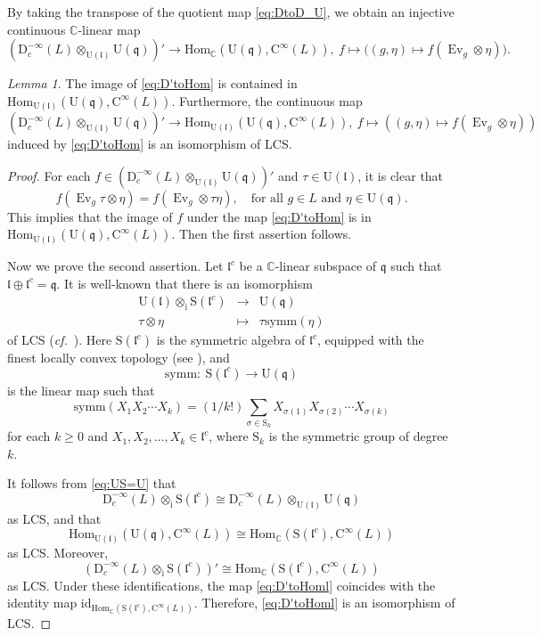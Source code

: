 \documentclass[12pt, a4paper]{amsart}
\newcommand{\BC}{{\mathbb {C}}}
\newcommand{\RC}{{\mathrm {C}}}
\newcommand{\RD}{{\mathrm {D}}}
\newcommand{\Ri}{{\mathrm{i}}}
\newcommand{\RS}{{\mathrm {S}}}
\newcommand{\RU}{{\mathrm {U}}}
\newcommand{\Hom}{{\mathrm{Hom}}}
\newcommand{\Ev}{\operatorname{Ev}}
\newcommand{\q}{\mathfrak q}
\renewcommand{\l}{\mathfrak l}
\newcommand{\be}{\begin {equation}}
\newcommand{\ee}{\end {equation}}
\newcommand{\cf}{\textit{cf.}~}
\theoremstyle{Theorem}
\theoremstyle{Theorem}
\theoremstyle{Theorem}
\theoremstyle{Theorem}
\theoremstyle{Plain}
\theoremstyle{remark}
\theoremstyle{remark}
\theoremstyle{Definition}
\newtheorem{lemd}[dfn]{Lemma}
\numberwithin{equation}{section}
\begin{document}
By taking the transpose of the quotient map \eqref{eq:DtoD_U}, we obtain an injective continuous $\BC$-linear map 
\be\label{eq:D'toHom} (\RD^{-\infty}_c(L)\otimes_{\RU(\l)}\RU(\q))'\rightarrow \Hom_{\BC}(\RU(\q),\RC^{\infty}(L)),\  f\mapsto \big((g,\eta)\mapsto f(\Ev_g\otimes\eta)\big).\ee


\begin{lemd}\label{lem:D'toHom} The image of \eqref{eq:D'toHom} is contained in $\Hom_{\RU(\l)}(\RU(\q),\RC^{\infty}(L))$. Furthermore, the 
continuous map 
    \be \label{eq:D'toHoml}(\RD^{-\infty}_c(L)\otimes_{\RU(\l)}\RU(\q))'\rightarrow \Hom_{\RU(\l)}(\RU(\q),\RC^{\infty}(L)), \ f\mapsto ((g,\eta)\mapsto f(\Ev_g\otimes\eta))\ee induced by \eqref{eq:D'toHom}  is an isomorphism of LCS.
\end{lemd}
\begin{proof}
  For each $f\in(\RD^{-\infty}_c(L)\otimes_{\RU(\l)}\RU(\q))' $ and  $\tau\in \RU(\l)$, it is clear that 
    \[f(\Ev_g\tau\otimes\eta)=f(\Ev_g\otimes\tau\eta),\quad \text{for all $g\in L$ and $\eta\in \RU(\q)$}.\]
    This implies that the image of $f$ under the map \eqref{eq:D'toHom} is in $\Hom_{\RU(\l)}(\RU(\q),\RC^{\infty}(L))$. Then the first assertion follows. 

Now we prove the second assertion.
Let $\l^c$ be a $\BC$-linear subspace of $\q$ such that $\l\oplus\l^c=\q$. 
It is well-known that there is an isomorphism 
\be\label{eq:US=U} \begin{array}{rcl}
    \RU(\l)\otimes_{\Ri} \RS(\l^c) &  \rightarrow& \RU(\q)\\
    \tau\otimes\eta &   \mapsto& \tau\mathrm{symm}(\eta)
\end{array}\ee
of LCS (\cf \cite[0.4.3]{Wa}). Here $\RS(\l^c)$
is the symmetric algebra of $\l^c$, equipped with the finest
locally convex topology (see \cite[Example B.3]{CSW2}), and \[\mathrm{symm}: \ \RS(\l^c)\rightarrow \RU(\q)\] is the linear map such that 
\[\mathrm{symm}(X_1X_2\cdots X_k)=(1/k!)\sum_{\sigma\in \RS_k} X_{\sigma(1)}X_{\sigma(2)}\cdots X_{\sigma(k)}\]
for each $k\geq0$ and $X_1,X_2,\dots,X_k \in \l^{c}$, where $\RS_k$ is the symmetric group
of degree $k$. 

It follows from \eqref{eq:US=U} that 
\be\label{eq:D=[]}\RD^{-\infty}_c(L)\otimes_{\Ri} \RS(\l^c)\cong \RD^{-\infty}_c(L)\otimes_{\RU(\l)}\RU(\q)\ee
as LCS, and that 
\[\Hom_{\RU(\l)}(\RU(\q),\RC^{\infty}(L))\cong \Hom_{\BC}(\RS(\l^c),\RC^{\infty}(L))\] as LCS.
Moreover, 
\[(\RD^{-\infty}_c(L)\otimes_{\Ri} \RS(\l^c))'\cong \Hom_{\BC}(\RS(\l^c),\RC^{\infty}(L))\]
as LCS.
 Under these identifications, the map \eqref{eq:D'toHoml} coincides with the identity map 
$\mathrm{id}_{\Hom_{\BC}(\RS(\l^c),\RC^{\infty}(L))}$. 
Therefore, \eqref{eq:D'toHoml} is an isomorphism of LCS.
 \end{proof}
\end{document}
